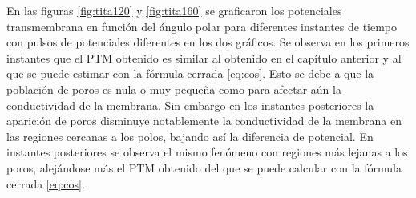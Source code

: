 

En las figuras \ref{fig:tita120} y \ref{fig:tita160} se graficaron los potenciales transmembrana en función del ángulo polar para diferentes instantes de tiempo con pulsos de potenciales diferentes en los dos gráficos. Se observa en los primeros instantes que el PTM obtenido es similar al obtenido en el capítulo anterior y al que se puede estimar con la fórmula cerrada \ref{eq:cos}. Esto se debe a que la población de poros es nula o muy pequeña como para afectar aún la conductividad de la membrana. Sin embargo en los instantes posteriores la aparición de poros disminuye notablemente la conductividad de la membrana en las regiones cercanas a los polos, bajando así la diferencia de potencial. En instantes posteriores se observa el mismo fenómeno con regiones más lejanas a los poros, alejándose más el PTM obtenido del que se puede calcular con la fórmula cerrada \ref{eq:cos}.

